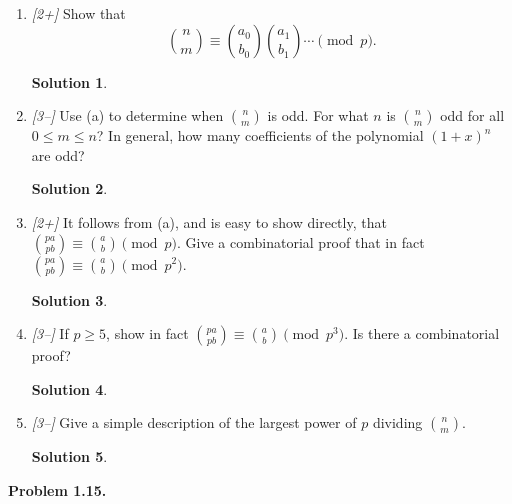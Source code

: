 \documentclass[11pt]{article}
\theoremstyle{definition}
\newtheorem*{solution}{Solution}
\newcounter{probnum}
\newcommand{\problem}[1]{%
  \setcounter{probnum}{#1}%
  \medskip
  \noindent\textbf{Problem 1.#1.}\quad
}
\begin{document}
\begin{enumerate}[label=(\alph*)]
  \item \textit{[2+]} Show that
    \[ \binom{n}{m} \equiv \binom{a_0}{b_0}\binom{a_1}{b_1}\cdots \pmod{p}. \]
    \begin{solution}
    \end{solution}

  \item \textit{[3--]} Use (a) to determine when $\binom{n}{m}$ is odd. For what $n$
    is $\binom{n}{m}$ odd for all $0\leq m\leq n$? In general, how many coefficients
    of the polynomial $(1+x)^n$ are odd?
    \begin{solution}
    \end{solution}

  \item \textit{[2+]} It follows from (a), and is easy to show directly, that
    $\binom{pa}{pb} \equiv \binom{a}{b} \pmod{p}$. Give a combinatorial proof that
    in fact $\binom{pa}{pb} \equiv \binom{a}{b} \pmod{p^2}$.
    \begin{solution}
    \end{solution}

  \item \textit{[3--]} If $p\geq 5$, show in fact
    $\binom{pa}{pb} \equiv \binom{a}{b} \pmod{p^3}$. Is there a combinatorial proof?
    \begin{solution}
    \end{solution}

  \item \textit{[3--]} Give a simple description of the largest power of $p$ dividing
    $\binom{n}{m}$.
    \begin{solution}
    \end{solution}
\end{enumerate}

\problem{15} \hfill
\end{document}
